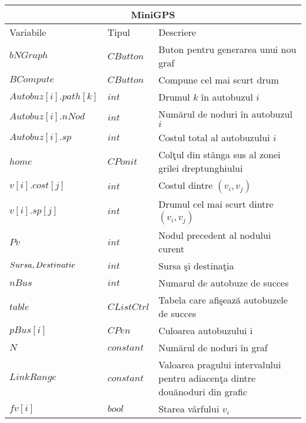 \documentclass[11pt,a4paper]{report}
\begin{document}
\begin{center}
\begin{tabular}{ |p{2.9cm}|p{2cm}|p{6cm}|  }
	
 \hline
 \multicolumn{3}{|c|}{MiniGPS} \\
 \hline

  Variabile & Tipul & Descriere\\
 \hline

 $bNGraph$        & $CButton$   & Buton pentru generarea unui nou graf\vspace{0.1cm}  \\
 \hline
 $BCompute$       & $CButton$   & Compune cel mai scurt drum\vspace{0.1cm} \\
 \hline
 $Autobuz[i].path[k]$ & $int$       & Drumul $k$ \^ in autobuzul $i$\vspace{0.1cm} \\
 \hline
 $Autobuz[i].nNod$  & $int$       & Num\u arul de noduri \^ in autobuzul $i$ \vspace{0.1cm}\\
 \hline
 $Autobuz[i].sp$      & $int$       & Costul total al autobuzului $i$\vspace{0.1cm}\\
 \hline
 $home$           & $CPonit$    & Col\c tul din st\^ anga sus al zonei grilei dreptunghiului \vspace{0.1cm}   \\
 \hline
 $v[i].cost[j]$     & $int$       & Costul dintre $(v_{i}, v_{j})$\vspace{0.1cm}\\
 \hline
 $v[i].sp[j]$     & $int$       & Drumul cel mai scurt dintre $(v_{i}, v_{j})$\vspace{0.1cm}\\
 \hline
 $Pv$             & $int$       & Nodul precedent al nodului curent\vspace{0.1cm}\\
 \hline
 $Sursa, \newline Destinatie$         & $int$       & Sursa \c si destina\c tia\vspace{0.1cm}\\
 \hline
 $nBus$           & $int$       & Numarul de autobuze de succes\vspace{0.1cm}\\
 \hline
 $table$          & $CListCtrl$ & Tabela care afi\c seaz\u a autobuzele de succes\vspace{0.1cm}\\
 \hline
 $pBus[i]$        & $CPen$      & Culoarea autobuzului i\vspace{0.1cm}\\
 \hline
 $N$              & $constant$  & Num\u arul de noduri \^ in graf\vspace{0.1cm}\\
 \hline
 $LinkRange$      & $constant$  & Valoarea pragului intervalului pentru adiacen\c ta dintre dou\u anoduri din grafic\vspace{0.1cm}\\
 \hline
 $fv[i]$          & $bool$      & Starea v\^ arfului $v_{i}$\vspace{0.1cm}\\
 

\end{tabular}
\end{center}
\end{document}
